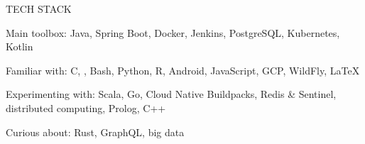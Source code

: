 \begin{minipage}[t]{\linewidth}\vspace{\sectionTopmargin}
{\alignRight\titleFont\light TECH STACK}\linebreak\newline

\vspace{\contentTopMargin}
{\contentFont\bold Main toolbox: \medium Java, Spring Boot, Docker, Jenkins, PostgreSQL, Kubernetes, Kotlin} %

\vspace{2mm}
{\contentFont\bold Familiar with: \medium C, , Bash, Python, R, Android, JavaScript, GCP, WildFly, \LaTeX}

\vspace{2mm}
{\contentFont\bold Experimenting with: \medium Scala, Go, Cloud Native Buildpacks, Redis \& Sentinel, distributed computing, Prolog, C++}

\vspace{2mm}
{\contentFont\bold Curious about: \medium Rust, GraphQL, big data}
\end{minipage}\newline%